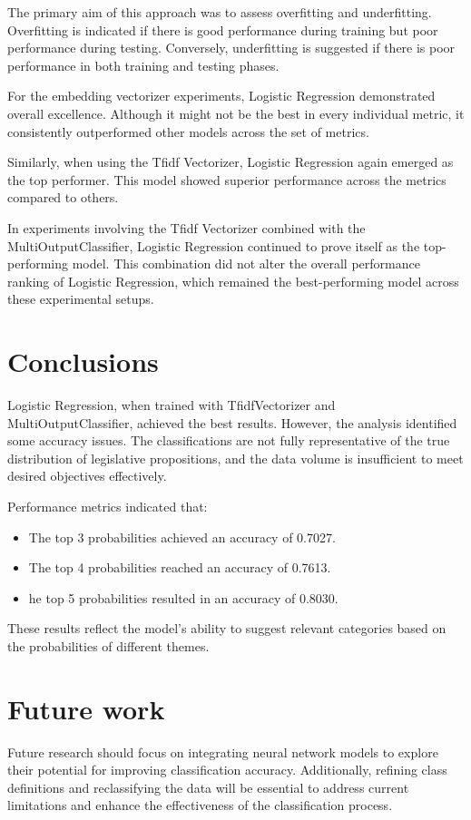 \documentclass[12pt]{article}
\begin{document}
The primary aim of this approach was to assess overfitting and underfitting. Overfitting is indicated if there is good performance during training but poor performance during testing. Conversely, underfitting is suggested if there is poor performance in both training and testing phases.

For the embedding vectorizer experiments, Logistic Regression demonstrated overall excellence. Although it might not be the best in every individual metric, it consistently outperformed other models across the set of metrics.

Similarly, when using the Tfidf Vectorizer, Logistic Regression again emerged as the top performer. This model showed superior performance across the metrics compared to others.

In experiments involving the Tfidf Vectorizer combined with the MultiOutputClassifier, Logistic Regression continued to prove itself as the top-performing model. This combination did not alter the overall performance ranking of Logistic Regression, which remained the best-performing model across these experimental setups.

\section{Conclusions}

Logistic Regression, when trained with TfidfVectorizer and MultiOutputClassifier, achieved the best results. However, the analysis identified some accuracy issues. The classifications are not fully representative of the true distribution of legislative propositions, and the data volume is insufficient to meet desired objectives effectively.

Performance metrics indicated that:

\begin{itemize}
	\item The top 3 probabilities achieved an accuracy of 0.7027.
	\item The top 4 probabilities reached an accuracy of 0.7613.
	\item he top 5 probabilities resulted in an accuracy of 0.8030.
\end{itemize}

These results reflect the model's ability to suggest relevant categories based on the probabilities of different themes.

\section{Future work}


Future research should focus on integrating neural network models to explore their potential for improving classification accuracy. Additionally, refining class definitions and reclassifying the data will be essential to address current limitations and enhance the effectiveness of the classification process.

	


	
\end{document}
